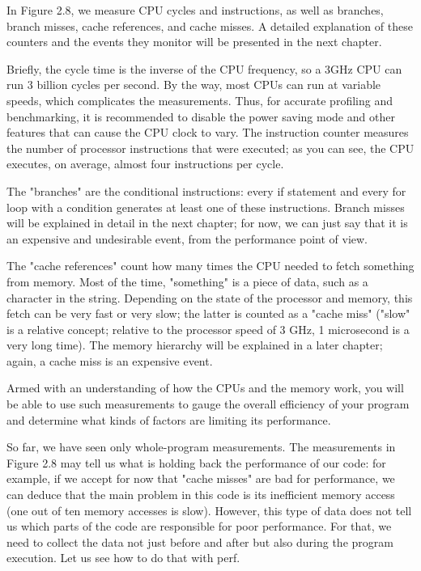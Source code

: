 In Figure 2.8, we measure CPU cycles and instructions, as well as branches, branch misses, cache references, and cache misses. A detailed explanation of these counters and the events they monitor will be presented in the next chapter.

Briefly, the cycle time is the inverse of the CPU frequency, so a 3GHz CPU can run 3 billion cycles per second. By the way, most CPUs can run at variable speeds, which complicates the measurements. Thus, for accurate profiling and benchmarking, it is recommended to disable the power saving mode and other features that can cause the CPU clock to vary. The instruction counter measures the number of processor instructions that were executed; as you can see, the CPU executes, on average, almost four instructions per cycle.

The "branches" are the conditional instructions: every if statement and every for loop with a condition generates at least one of these instructions. Branch misses will be explained in detail in the next chapter; for now, we can just say that it is an expensive and undesirable event, from the performance point of view.

The "cache references" count how many times the CPU needed to fetch something from memory. Most of the time, "something" is a piece of data, such as a character in the string. Depending on the state of the processor and memory, this fetch can be very fast or very slow; the latter is counted as a "cache miss" ("slow" is a relative concept; relative to the processor speed of 3 GHz, 1 microsecond is a very long time). The memory hierarchy will be explained in a later chapter; again, a cache miss is an expensive event. 

Armed with an understanding of how the CPUs and the memory work, you will be able to use such measurements to gauge the overall efficiency of your program and determine what kinds of factors are limiting its performance.

So far, we have seen only whole-program measurements. The measurements in Figure 2.8 may tell us what is holding back the performance of our code: for example, if we accept for now that "cache misses" are bad for performance, we can deduce that the main problem in this code is its inefficient memory access (one out of ten memory accesses is slow). However, this type of data does not tell us which parts of the code are responsible for poor performance. For that, we need to collect the data not just before and after but also during the program execution. Let us see how to do that with perf.

